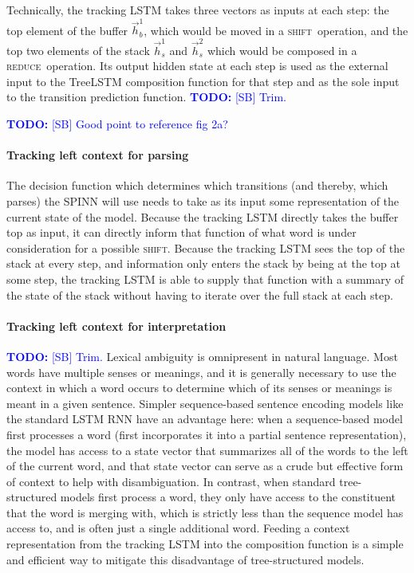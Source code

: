 \documentclass[11pt]{article}
\newcommand\todo[1]{\textcolor{blue}{\textbf{TODO:} #1}}
\newcommand{\shift}{\textsc{shift}}
\newcommand{\reduce}{\textsc{reduce}}
\begin{document}
Technically, the tracking LSTM takes three vectors as inputs at each step: the top element of the buffer $\vec{h}_b^1$, which would be moved in a \shift~operation, and the top two elements of the stack $\vec{h}_s^1$ and $\vec{h}_s^2$ which would be composed in a \reduce~operation. Its output hidden state at each step is used as the external input to the TreeLSTM composition function for that step and as the sole input to the transition prediction function. \todo{[SB] Trim.}

\todo{[SB] Good point to reference fig 2a?}

\paragraph{Tracking left context for parsing} The decision function which determines which transitions (and thereby, which parses) the SPINN will use needs to take as its input some representation of the current state of the model. Because the tracking LSTM directly takes the buffer top as input, it can directly inform that function of what word is under consideration for a possible \shift. Because the tracking LSTM sees the top of the stack at every step, and information only enters the stack by being at the top at some step, the tracking LSTM is able to supply that function with a summary of the state of the stack without having to iterate over the full stack at each step.

\paragraph{Tracking left context for interpretation} \todo{[SB] Trim.} Lexical ambiguity is omnipresent in natural language. Most words have multiple senses or meanings, and it is generally necessary to use the context in which a word occurs to determine which of its senses or meanings is meant in a given sentence. Simpler sequence-based sentence encoding models like the standard LSTM RNN have an advantage here: when a sequence-based model first processes a word (first incorporates it into a partial sentence representation), the model has access to a state vector that summarizes all of the words to the left of the current word, and that state vector can serve as a crude but effective form of context to help with disambiguation. In contrast, when standard tree-structured models first process a word, they only have access to the constituent that the word is merging with, which is strictly less than the sequence model has access to, and is often just a single additional word. Feeding a context representation from the tracking LSTM into the composition function is a simple and efficient way to mitigate this disadvantage of tree-structured models.
\end{document}
